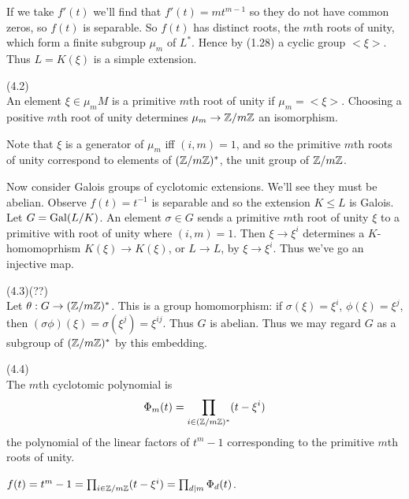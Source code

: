 \documentclass[a4paper]{article}
\begin{document}
\begin{rem}
If we take $f'(t)$ we'll find that $f'(t) = mt^{m-1}$ so they do not have common zeros, so $f(t)$ is separable. So $f(t)$ has distinct roots, the $m$th roots of unity, which form a finite subgroup $\mu_m$ of $L^*$. Hence by  (1.28) a cyclic group $<\xi>$. Thus $L = K(\xi)$ is a simple extension.
\end{rem}

\begin{defi} (4.2)\\
An element $\xi \in \mu_mM$ is a primitive $m$th root of unity if $\mu_m = <\xi>$. Choosing a positive $m$th root of unity determines $\mu_m \to \mathbb{Z}/m\mathbb{Z}$ an isomorphism.
\end{defi}

Note that $\xi$ is a generator of $\mu_m$ iff $(i,m) = 1$, and so the primitive $m$th roots of unity correspond to elements of $(\mathbb{Z}/m\mathbb{Z})^*$, the unit group of $\mathbb{Z}/m\mathbb{Z}$.

Now consider Galois groups of cyclotomic extensions. We'll see they must be abelian. Observe $f(t) = t^{-1}$ is separable and so the extension $K \leq L$ is Galois. Let $G=\operatorname{Gal}(L/K)$. An element $\sigma \in G$ sends a primitive $m$th root of unity $\xi$ to a primitive with root of unity where $(i,m) = 1$. Then $\xi \to \xi^i$ determines a $K$-homomoprhism $K(\xi) \to K(\xi)$, or $L \to L$, by $\xi \to \xi^i$. Thus we've go an injective map.

\begin{defi} (4.3)(??)\\
Let $\theta:G \to (\mathbb{Z}/m\mathbb{Z})^*$. This is a group homomorphism: if $\sigma(\xi) = \xi^i$, $\phi(\xi) = \xi^j$, then $(\sigma\phi)(\xi) = \sigma(\xi^j) = \xi^{ij}$. Thus $G$ is abelian. Thus we may regard $G$ as a subgroup of $(\mathbb{Z}/m\mathbb{Z})^*$ by this embedding. 
\end{defi}

\begin{defi} (4.4)\\
The $m$th cyclotomic polynomial is
\begin{equation*}
\begin{aligned}
\Phi_m(t) = \prod_{i \in (\mathbb{Z}/m\mathbb{Z})^*} (t-\xi^i)
\end{aligned}
\end{equation*}
the polynomial of the linear factors of $t^m-1$ corresponding to the primitive $m$th roots of unity.
\end{defi}

\begin{rem}
$f(t) = t^m-1 = \prod_{i \in \mathbb{Z}/m\mathbb{Z}} (t-\xi^i) = \prod_{d| m} \Phi_d(t)$.
\end{rem}
\end{document}
